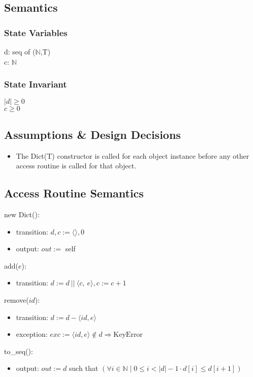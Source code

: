 \documentclass[12pt, titlepage]{article}
\begin{document}
\subsection*{Semantics}
\subsubsection*{State Variables}
d: seq of ($\mathbb{N}$,T) \\
c: $\mathbb{N}$

\subsubsection*{State Invariant}
$|d| \geq 0$\\
$c \geq 0$

\subsection*{Assumptions \& Design Decisions}
\begin{itemize}
  \item The Dict(T) constructor is called for each object instance before any other access routine is called for that object.
\end{itemize}

\subsection*{Access Routine Semantics}
\noindent new Dict():
\begin{itemize}
    \item transition: $d, c := \langle \rangle, 0$
    
    \item output: $out :=$ self
\end{itemize}

\noindent add($e$):
\begin{itemize}
    \item transition: $d :=  d\ ||\ \langle c,\ e \rangle, c := c + 1$
\end{itemize}

\noindent remove($id$):
\begin{itemize}
    \item transition: $d :=  d - \langle id, e \rangle$
    \item exception: $exc := \langle id, e \rangle \notin d \Rightarrow \text{KeyError}$
\end{itemize}

\noindent to\_seq():
\begin{itemize}
    \item output: $out := d$ such that $(\forall i \in \mathbb{N} \mid 0 \leq i < |d| - 1 \cdot d[i] \leq d[i + 1] )$
\end{itemize}
\end{document}
